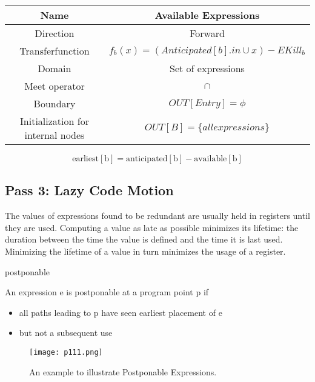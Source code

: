 \begin{center}
	\begin{tabular}{|c|c|}
		\hline Name                              & Available Expressions                                \\
		\hline Direction                         & Forward                                              \\
		\hline Transferfunction                  & \( f_b(x) = (Anticipated[b].in \cup x ) - EKill_b \) \\
		\hline Domain                            & Set of expressions                                   \\
		\hline Meet operator                     & \( \cap \)                                           \\
		\hline Boundary                          & $OUT[Entry] = \phi$                                  \\
		\hline Initialization for internal nodes & \( OUT[B] = \{ all expressions\} \)                  \\
		\hline
	\end{tabular}
\end{center}


\[
	\mathrm{earliest[b] = anticipated[b] - available[b]}
\]


\subsection{Pass 3: Lazy Code Motion}
The values of expressions found to be redundant are usually
held in registers until they are used. Computing a value as late as possible minimizes its lifetime:
the duration between the time the value is defined and the
time it is last used. Minimizing the lifetime of a value in turn minimizes the usage of
a register.


\begin{definition}{postponable}

	An expression e is postponable at a program point p if
	\begin{itemize}
		\item all paths leading to p have seen earliest placement of e
		\item but not a subsequent use
	\end{itemize}

	\begin{figure}[H]
		\centering
		\texttt{[image: p111.png]}
		\caption{An example to illustrate Postponable Expressions.}
		\label{fig:p111}
	\end{figure}
\end{definition}




